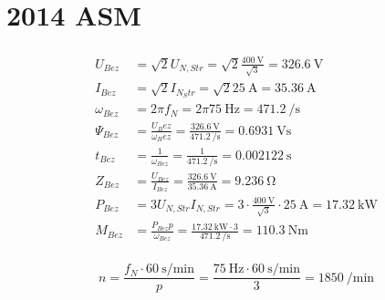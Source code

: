 \documentclass[11pt,a4paper]{scrartcl}
\newcommand{\0}{_{\mybr{0}}}
\newcommand{\1}{_{\mybr{1}}}
\newcommand{\2}{_{\mybr{2}}}
\begin{document}
\clearpage
\part{2014 ASM}
\section{}
\subsection{}
\begin{align}
U_{Bez}&=\sqrt{2}U_{N,Str}=\sqrt{2}\frac{\SI{400}{\volt}}{\sqrt{3}}=\SI{326.6}{\volt}\\
I_{Bez}&=\sqrt{2}I_{N_Str}=\sqrt{2}\SI{25}\ampere=\SI{35.36}{\ampere}\\
\omega_{Bez}&=2\pi f_N=2 \pi \SI{75}{\hertz}=\SI{471.2}{\per\second}\\
\Psi_{Bez}&=\frac{U_Bez}{\omega_Bez}=\frac{\SI{326.6}{\volt}}{\SI{471.2}{\per\second}}=\SI{0.6931}{\volt\second}\\
t_{Bez}&=\frac{1}{\omega_{Bez}}=\frac{1}{\SI{471.2}{\per\second}}=\SI{0.002122}{\second}\\
Z_{Bez}&=\frac{U_{Bez}}{I_{Bez}}=\frac{\SI{326.6}{\volt}}{\SI{35.36}{\ampere}}=\SI{9.236}{\ohm}\\
P_{Bez}&=3U_{N,Str}I_{N,Str}=3\cdot\frac{\SI{400}{\volt}}{\sqrt{3}}\cdot\SI{25}{\ampere}=\SI{17.32}{\kilo\watt}\\
M_{Bez}&=\frac{P_{Bez}p}{\omega_{Bez}}=\frac{\SI{17.32}{\kilo\watt}\cdot 3}{\SI{471.2}{\per\second}}=\SI{110.3}{\newton\metre}
\end{align}

\subsection{}
\begin{equation}
n=\frac{f_N\cdot\SI{60}{\second\per\minute}}{p}=\frac{\SI{75}{\hertz}\cdot\SI{60}{\second\per\minute}}{3}=\SI{1850}{\per\minute}
\end{equation}
\end{document}
